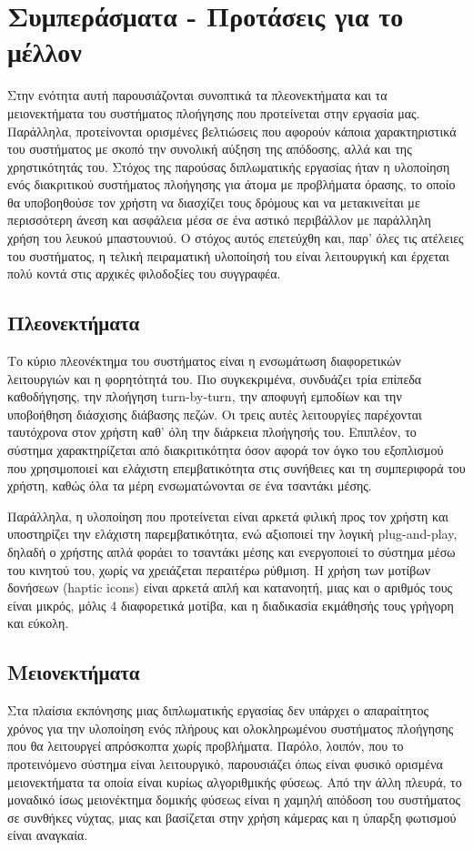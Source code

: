 \chapter{Συμπεράσματα - Προτάσεις για το μέλλον} \label{ch:conclusion}

Στην ενότητα αυτή παρουσιάζονται συνοπτικά τα πλεονεκτήματα και τα μειονεκτήματα του συστήματος πλοήγησης που προτείνεται στην εργασία μας. Παράλληλα, προτείνονται ορισμένες βελτιώσεις που αφορούν κάποια χαρακτηριστικά του συστήματος με σκοπό την συνολική αύξηση της απόδοσης, αλλά και της χρηστικότητάς του. Στόχος της παρούσας διπλωματικής εργασίας ήταν η υλοποίηση ενός διακριτικού συστήματος πλοήγησης για άτομα με προβλήματα όρασης, το οποίο θα υποβοηθούσε τον χρήστη να διασχίζει τους δρόμους και να μετακινείται με περισσότερη άνεση και ασφάλεια μέσα σε ένα αστικό περιβάλλον με παράλληλη χρήση του λευκού μπαστουνιού. Ο στόχος αυτός επετεύχθη και, παρ' όλες τις ατέλειες του συστήματος, η τελική πειραματική υλοποίησή του είναι λειτουργική και έρχεται πολύ κοντά στις αρχικές φιλοδοξίες του συγγραφέα.

\section{Πλεονεκτήματα}
Το κύριο πλεονέκτημα του συστήματος είναι η ενσωμάτωση διαφορετικών λειτουργιών και η φορητότητά του. Πιο συγκεκριμένα, συνδυάζει τρία επίπεδα καθοδήγησης, την πλοήγηση turn-by-turn, την αποφυγή εμποδίων και την υποβοήθηση διάσχισης διάβασης πεζών. Οι τρεις αυτές λειτουργίες παρέχονται ταυτόχρονα στον χρήστη καθ' όλη την διάρκεια πλοήγησής του. Επιπλέον, το σύστημα χαρακτηρίζεται από διακριτικότητα όσον αφορά τον όγκο του εξοπλισμού που χρησιμοποιεί και ελάχιστη επεμβατικότητα στις συνήθειες και τη συμπεριφορά του χρήστη, καθώς όλα τα μέρη ενσωματώνονται σε ένα τσαντάκι μέσης.

Παράλληλα, η υλοποίηση που προτείνεται είναι αρκετά φιλική προς τον χρήστη και υποστηρίζει την ελάχιστη παρεμβατικότητα, ενώ αξιοποιεί την λογική plug-and-play, δηλαδή ο χρήστης απλά φοράει το τσαντάκι μέσης και ενεργοποιεί το σύστημα μέσω του κινητού του, χωρίς να χρειάζεται περαιτέρω ρύθμιση. Η χρήση των μοτίβων δονήσεων (haptic icons) είναι αρκετά απλή και κατανοητή, μιας και ο αριθμός τους είναι μικρός, μόλις 4 διαφορετικά μοτίβα, και η διαδικασία εκμάθησής τους γρήγορη και εύκολη.

\section{Μειονεκτήματα}
Στα πλαίσια εκπόνησης μιας διπλωματικής εργασίας δεν υπάρχει ο απαραίτητος χρόνος για την υλοποίηση ενός πλήρους και ολοκληρωμένου συστήματος πλοήγησης που θα λειτουργεί απρόσκοπτα χωρίς προβλήματα. Παρόλο, λοιπόν, που το προτεινόμενο σύστημα είναι λειτουργικό, παρουσιάζει όπως είναι φυσικό ορισμένα μειονεκτήματα τα οποία είναι κυρίως αλγοριθμικής φύσεως. Από την άλλη πλευρά, το μοναδικό ίσως μειονέκτημα δομικής φύσεως είναι η χαμηλή απόδοση του συστήματος σε συνθήκες νύχτας, μιας και βασίζεται στην χρήση κάμερας και η ύπαρξη φωτισμού είναι αναγκαία.


